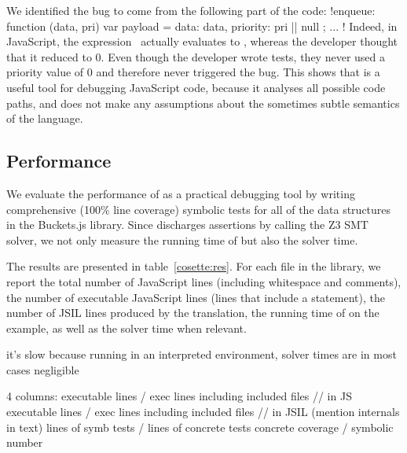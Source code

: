 We identified the bug to come from the following part of the code: \jsinline!enqueue: function (data, pri) {var payload = { data: data, priority: pri || null }; ... }!
Indeed, in JavaScript, the expression  actually evaluates to , whereas the developer thought that it reduced to 0.
Even though the developer wrote tests, they never used a priority value of 0 and therefore never triggered the bug.
This shows that \cosette is a useful tool for debugging JavaScript code, because it analyses all possible code paths, and does not make any assumptions about the sometimes subtle semantics of the language.

\subsection{Performance}

We evaluate the performance of \cosette as a practical debugging tool by writing comprehensive (100\% line coverage) symbolic tests for all of the data structures in the Buckets.js library.
Since \cosette discharges assertions by calling the Z3 SMT solver, we not only measure the running time of \cosette but also the solver time.

The results are presented in table~\ref{cosette:res}.
For each file in the library, we report the total number of JavaScript lines (including whitespace and comments), the number of executable JavaScript lines (lines that include a statement), the number of JSIL lines produced by the translation, the running time of \cosette on the example, as well as the solver time when relevant.

it's slow because running in an interpreted environment, solver times are in most cases 
negligible

4 columns:
executable lines / exec lines including included files // in JS
executable lines / exec lines including included files // in JSIL (mention internals in text)
 lines of symb tests / lines of concrete tests
concrete coverage / symbolic number 

